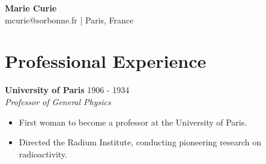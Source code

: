 \documentclass{article}
\begin{document}
\begin{center}
\LARGE \textbf{Marie Curie} \\
\normalsize mcurie@sorbonne.fr | Paris, France
\end{center}
\section*{Professional Experience}
\textbf{University of Paris} \hfill 1906 - 1934 \\
\textit{Professor of General Physics}
\begin{itemize}
    \item First woman to become a professor at the University of Paris.
    \item Directed the Radium Institute, conducting pioneering research on radioactivity.
\end{itemize}
\end{document}
